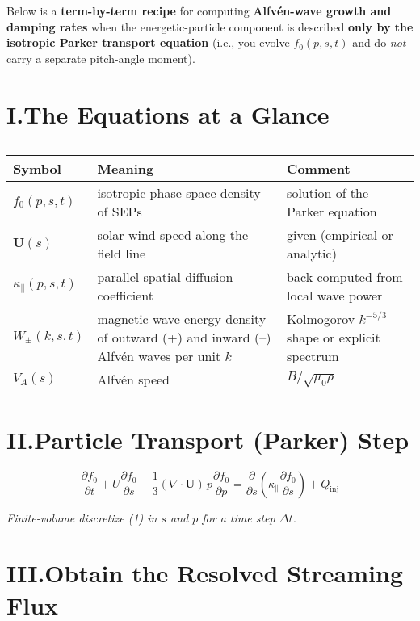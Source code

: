 \noindent
Below is a \textbf{term-by-term recipe} for computing \textbf{Alfvén-wave growth and damping rates} when the energetic-particle component is described \textbf{only by the isotropic Parker transport equation} (i.e., you evolve $f_0(p,s,t)$ and do \textit{not} carry a separate pitch-angle moment).

\section*{I.\quad The Equations at a Glance}

\begin{table}[h!]
\centering
\begin{tabular}{|p{3.5cm}|p{7.5cm}|p{5cm}|}
\hline
\textbf{Symbol} & \textbf{Meaning} & \textbf{Comment} \\
\hline
$f_0(p,s,t)$ & isotropic phase-space density of SEPs & solution of the Parker equation \\
\hline
$\boldsymbol{U}(s)$ & solar-wind speed along the field line & given (empirical or analytic) \\
\hline
$\kappa_\parallel(p,s,t)$ & parallel spatial diffusion coefficient & back-computed from local wave power \\
\hline
$W_\pm(k,s,t)$ & magnetic wave energy density of outward (+) and inward (–) Alfvén waves per unit $k$ & Kolmogorov $k^{-5/3}$ shape or explicit spectrum \\
\hline
$V_A(s)$ & Alfvén speed & $B / \sqrt{\mu_0 \rho}$ \\
\hline
\end{tabular}
\caption*{}
\end{table}

\section*{II.\quad Particle Transport (Parker) Step}

\[
\boxed{
\frac{\partial f_0}{\partial t}
+ U \frac{\partial f_0}{\partial s}
- \frac{1}{3} (\nabla \cdot \boldsymbol{U})\, p \frac{\partial f_0}{\partial p}
= \frac{\partial}{\partial s} \left( \kappa_\parallel \frac{\partial f_0}{\partial s} \right) + Q_{\text{inj}}
}
\tag{1}
\]

\noindent
\textit{Finite-volume discretize (1) in $s$ and $p$ for a time step $\Delta t$.}

\section*{III.\quad Obtain the \textbf{Resolved Streaming Flux}}

